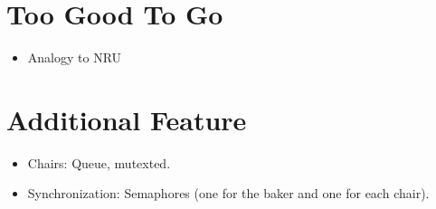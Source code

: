 \documentclass[11pt]{article}
\begin{document}
\section{Too Good To Go}
\label{sec:org626b7a7}
\begin{itemize}
\item Analogy to NRU\\
\end{itemize}

\section{Additional Feature}
\label{sec:org8151c41}
\begin{itemize}
\item Chairs: Queue, mutexted.\\
\item Synchronization: Semaphores (one for the baker and one for each chair).\\
\end{itemize}
\end{document}
